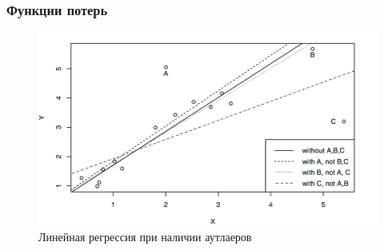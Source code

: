 \documentclass[notheorems,aspectratio=169]{beamer}
\begin{document}
\begin{frame}
  \frametitle{Функции потерь}
  \begin{figure}
    \includegraphics[height=0.7\textheight, keepaspectratio]{outliers.png}
    \caption*{Линейная регрессия при наличии аутлаеров}
  \end{figure}
\end{frame}
\end{document}
